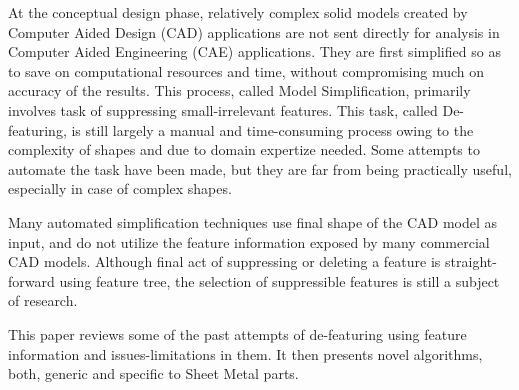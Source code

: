 At the conceptual design phase, relatively complex solid models created by Computer Aided Design (CAD) applications are not sent directly for analysis in Computer Aided Engineering (CAE) applications. They are first simplified so as to save on computational resources and time, without compromising much on accuracy of the results. This process, called Model Simplification, primarily involves task of suppressing small-irrelevant features. This task, called De-featuring, is still largely a manual and time-consuming process owing to the complexity of shapes and due to domain expertize needed. Some attempts to automate the task have been made, but they are far from being practically useful, especially in case of complex shapes.

Many automated simplification techniques use final shape of the CAD model as input, and do not utilize the feature information exposed by many commercial CAD models. Although final act of suppressing or deleting a feature is straight-forward using feature tree, the selection of suppressible features is still a subject of research.

This paper reviews some of the past attempts of de-featuring using feature information and issues-limitations in them. It then presents novel algorithms, both, generic and  specific to Sheet Metal parts.


